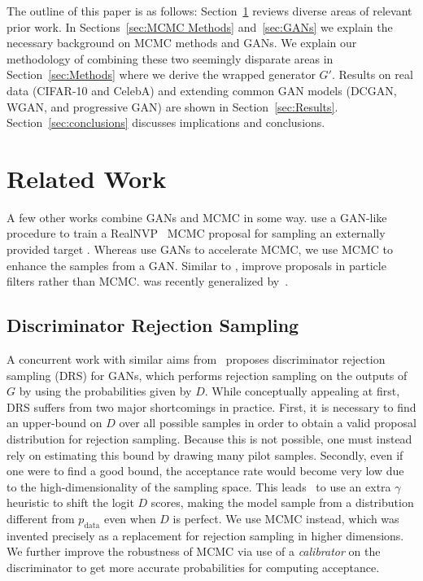 \documentclass{article}
\newcommand{\target}{{p^\star}}
\newcommand{\PR}{{p_{\textrm{data}}}}
\begin{document}
The outline of this paper is as follows:
Section~\ref{sec:Related Work} reviews diverse areas of relevant prior work.
In Sections~\ref{sec:MCMC Methods} and~\ref{sec:GANs} we explain the necessary background on MCMC methods and GANs.
We explain our methodology of combining these two seemingly disparate areas in Section~\ref{sec:Methods} where we derive the wrapped generator $G'$.
Results on real data (CIFAR-10 and CelebA) and extending common GAN models (DCGAN, WGAN, and progressive GAN) are shown in Section~\ref{sec:Results}.
Section~\ref{sec:conclusions} discusses implications and conclusions.

\section{Related Work}
\label{sec:Related Work}

A few other works combine GANs and MCMC in some way.
\citet{Song2017} use a GAN-like procedure to train a RealNVP~\citep{Dinh2016} MCMC proposal for sampling an externally provided target \smash{$\target$}.
Whereas \citet{Song2017} use GANs to accelerate MCMC, we use MCMC to enhance the samples from a GAN\@.
Similar to \citet{Song2017}, \citet{Kempinska2017} improve proposals in particle filters rather than MCMC\@.
\citet{Song2017} was recently generalized by~\citet{Neklyudov2018}.

\subsection{Discriminator Rejection Sampling}
A concurrent work with similar aims from~\citet{Azadi2018} proposes discriminator rejection sampling (DRS) for GANs, which performs rejection sampling on the outputs of $G$ by using the probabilities given by $D$.
While conceptually appealing at first, DRS suffers from two major shortcomings in practice.
First, it is necessary to find an upper-bound on $D$ over all possible samples in order to obtain a valid proposal distribution for rejection sampling.
Because this is not possible, one must instead rely on estimating this bound by drawing many pilot samples.
Secondly, even if one were to find a good bound, the acceptance rate would become very low due to the high-dimensionality of the sampling space.
This leads~\citet{Azadi2018} to use an extra $\gamma$ heuristic to shift the logit $D$ scores, making the model sample from a distribution different from $\PR$ even when $D$ is perfect.
We use MCMC instead, which was invented precisely as a replacement for rejection sampling in higher dimensions.
We further improve the robustness of MCMC via use of a \emph{calibrator} on the discriminator to get more accurate probabilities for computing acceptance.  %
\end{document}
